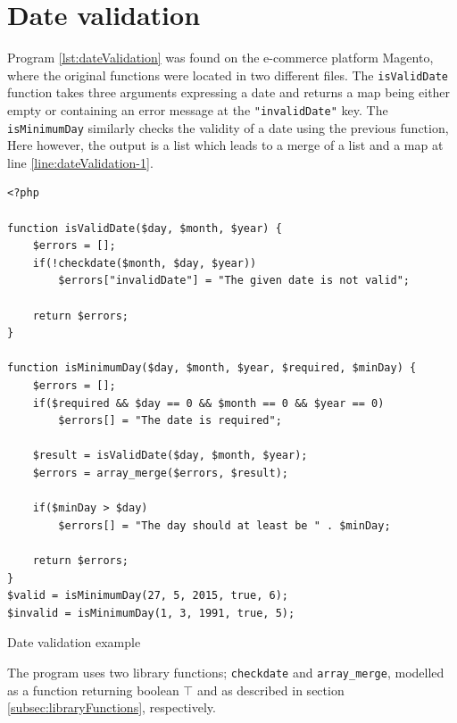 \newpage
\section{Date validation}
Program \ref{lst:dateValidation} was found on the e-commerce platform Magento, where the original functions were located in two different files. The \texttt{isValidDate} function takes three arguments expressing a date and returns a map being either empty or containing an error message at the \texttt{"invalidDate"} key.  The \texttt{isMinimumDay} similarly checks the validity of a date using the previous function, Here however, the output is a list which leads to a merge of a list and a map at line \ref{line:dateValidation-1}. 

\begin{program}
\begin{lstlisting}
<?php

function isValidDate($day, $month, $year) {
    $errors = [];
    if(!checkdate($month, $day, $year))
        $errors["invalidDate"] = "The given date is not valid";

    return $errors;
}

function isMinimumDay($day, $month, $year, $required, $minDay) {
    $errors = [];
    if($required && $day == 0 && $month == 0 && $year == 0)
        $errors[] = "The date is required";

    $result = isValidDate($day, $month, $year);
    $errors = array_merge($errors, $result);

    if($minDay > $day)
        $errors[] = "The day should at least be " . $minDay;

    return $errors;
}
$valid = isMinimumDay(27, 5, 2015, true, 6);
$invalid = isMinimumDay(1, 3, 1991, true, 5);
\end{lstlisting}
\caption{Date validation example}
\label{lst:dateValidation}
\end{program}

The program uses two library functions; \texttt{checkdate} and \texttt{array\_merge}, modelled as a function returning boolean $\top$ and as described in section \ref{subsec:libraryFunctions}, respectively.





